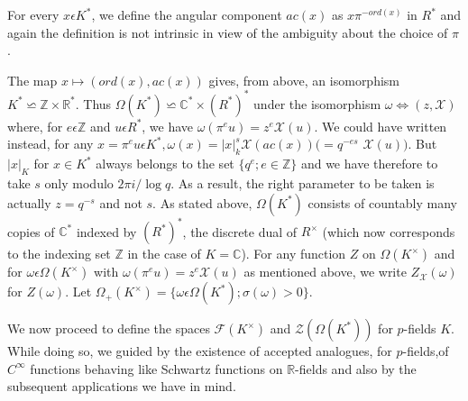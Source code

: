  For every $x\epsilon K^{\ast}$, we define the angular component
 $ac(x)$ as $x\pi^{-ord(x)}$ in $R^{\ast}$ and again the definition is
 not intrinsic in view of the ambiguity about the choice of $\pi$.

 The map $x\mapsto (ord (x), ac(x))$ gives, from above, an isomorphism
 $K^{\ast}\backsimeq \mathbb{Z} \times \mathbb{R}^{\ast}$. Thus
 $\Omega(K^{\ast})\backsimeq \mathbb{C}^{\ast}\times
 (R^{\ast})^{\ast}$ under the isomorphism
 $\omega\Leftrightarrow(z,\mathcal{X})$ where, for $e\epsilon
 \mathbb{Z}$ and $u\epsilon R^{\ast}$, we have
 $\omega(\pi^{e}u)=z^{e}\mathcal{X}(u)$. We could have written
 instead, for any $x=\pi^{e} u\epsilon
 K^{\ast},\omega(x)=|x|_{k}^{s}\mathcal{X}(ac(x))(=q^{-es}$ $\mathcal{X}(u))$. But
 $|x|_{K}$ for $x\in K^{\ast}$ always belongs to the set
 $\{q^{e};e\in \mathbb{Z}\}$ and we have therefore to take $s$ only
 modulo $2\pi i/\log q$. As a result, the right parameter to be taken
 is actually $z=q^{-s}$ and not $s$. As stated above, $\Omega(K^{\ast})$
 consists of countably many copies of $\mathbb{C}^{\ast}$ indexed by
 $(R^{\ast})^{\ast}$, the discrete dual of $R^{\times}$ (which now
 corresponds to the indexing set $\mathbb{Z}$ in the case of
 $K=\mathbb{C}$). For any function $Z$ on $\Omega(K^{\times})$ and for
 $\omega\epsilon \Omega(K^{\times})$ with
 $\omega(\pi^{e}u)=z^{e}\mathcal{X}(u)$ as mentioned above, we write
 $Z_{\mathcal{X}}(\omega)$ for
 $Z(\omega)$. Let $\Omega_{+}(K^{\times})=\{\omega \epsilon
 \Omega(K^{\ast});\sigma(\omega)>0\}$.

 We now proceed to define the spaces $\mathscr{F}(K^{\times})$ and
 $\mathscr{Z}(\Omega(K^{\ast}))$ for $p$-fields $K$. While doing so, we
 guided by the existence of accepted analogues, for $p$-fields,\pageoriginale of
 $C^{\infty}$ functions behaving like Schwartz functions on
 $\mathbb{R}$-fields and also by the subsequent applications we have
 in mind.

\subsection{}\label{chap1:sec5:subsec2} %

